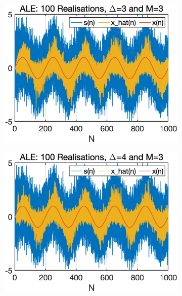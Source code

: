 \begin{figure}[htb]
\begin{subfigure}[b]{0.26\textwidth}
    \end{subfigure} 
    \hspace{-0.4cm}
    \begin{subfigure}[b]{0.26\textwidth}
     \centering
     \includegraphics[width=\textwidth]{fig/23/23a5.eps}
    \end{subfigure}
    \hspace{-0.4cm}
    \begin{subfigure}[b]{0.26\textwidth}
     \centering
     \includegraphics[width=\textwidth]{fig/23/23a7.eps}
    \end{subfigure}
    \\

\end{figure}
